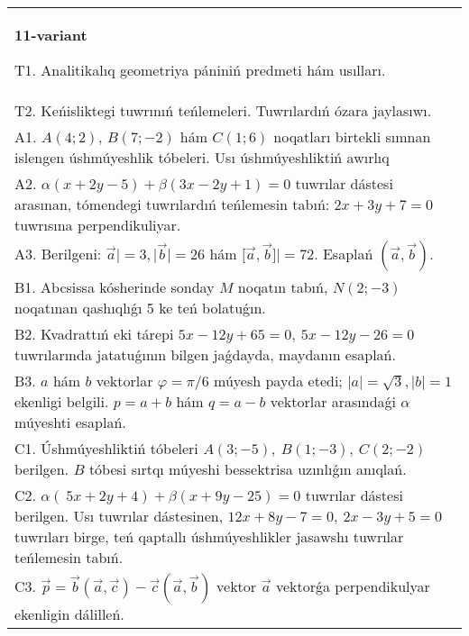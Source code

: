 \documentclass{article}
\begin{document}
\begin{tabular}{m{17cm}}
\textbf{11-variant}
\newline

T1. Analitikalıq geometriya pániniń predmeti hám usılları. 
 \\
T2. 
Keńisliktegi tuwrınıń teńlemeleri. Tuwrılardıń ózara jaylasıwı.
 \\
A1. 
$A(4;2)$, $B(7;-2)$ hám $C(1;6)$ noqatları birtekli
sımnan islengen úshmúyeshlik tóbeleri. Usı úshmúyeshliktiń awırlıq
 \\
A2. 
$\alpha(x+2y-5)+\beta(3x-2y+1)=0$ tuwrılar
dástesi arasınan, tómendegi tuwrılardıń teńlemesin tabıń:
$2x+3y+7=0$ tuwrısına perpendikuliyar.
 \\
A3. 
Berilgeni: $\overrightarrow{a}| = 3,|\overrightarrow{b}| = 26$ hám
$\lbrack\overrightarrow{a},\overrightarrow{b}\rbrack| = 72$. Esaplań
$\left(\overrightarrow{a},\overrightarrow{b} \right) $.
 \\
B1. 
Abcsissa kósherinde sonday $M$ noqatın tabıń,
\(N(2;-3)\) noqatınan qashıqlıǵı 5 ke teń bolatuǵın.
 \\
B2. 
Kvadrattıń eki tárepi
\(5x-12y+65=0,\ 5x-12y-26=0\) tuwrılarında
jatatuǵının bilgen jaǵdayda, maydanın esaplań.
 \\
B3. 
$a$ hám $b$ vektorlar $\varphi = \pi/6$ múyesh payda etedi; $|a| = \sqrt{3},|b| = 1$ ekenligi belgili. $p = a + b$ hám $q = a - b$ vektorlar arasındaǵi $\alpha$ múyeshti esaplań.
 \\
C1. 
Úshmúyeshliktiń tóbeleri
\(A(3; - 5),\ B(1; - 3),\ C(2; - 2)\) berilgen. $B$ tóbesi sırtqı
múyeshi bessektrisa uzınlıǵın anıqlań.
 \\
C2. 
\(\alpha (\ 5x + 2y + 4) + \beta(x + 9y - 25) = 0\) 
tuwrılar dástesi berilgen. Usı tuwrılar dástesinen,
\(12x + 8y - 7 = 0,\ 2x - 3y + 5 = 0\) tuwrıları birge, teń
qaptallı úshmúyeshlikler jasawshı tuwrılar teńlemesin tabıń.
 \\
C3. 
\(\vec{p} = \vec{b} (\vec{a},\vec{c}) - \vec{c}(\vec{a},\vec{b})\) vektor \(\vec{a}\) vektorǵa perpendikulyar ekenligin dálilleń.
 \\

\end{tabular}
\vspace{1cm}
\end{document}
